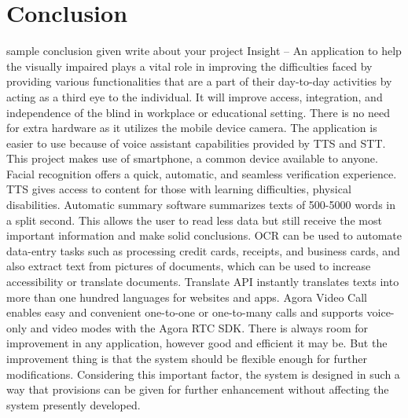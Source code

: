\chapter{Conclusion}
\thispagestyle{special}
sample conclusion given
write about your project
Insight – An application to help the visually impaired plays a vital role in improving the 
difficulties faced by providing various functionalities that are a part of their day-to-day
activities by acting as a third eye to the individual. It will improve access, integration, and 
independence of the blind in workplace or educational setting. There is no need for extra 
hardware as it utilizes the mobile device camera. The application is easier to use because 
of voice assistant capabilities provided by TTS and STT.
This project makes use of smartphone, a common device available to anyone. Facial 
recognition offers a quick, automatic, and seamless verification experience. TTS gives 
access to content for those with learning difficulties, physical disabilities. Automatic 
summary software summarizes texts of 500-5000 words in a split second. This allows the 
user to read less data but still receive the most important information and make solid 
conclusions.
OCR can be used to automate data-entry tasks such as processing credit cards, receipts, 
and business cards, and also extract text from pictures of documents, which can be used to 
increase accessibility or translate documents. Translate API instantly translates texts into 
more than one hundred languages for websites and apps. Agora Video Call enables easy 
and convenient one-to-one or one-to-many calls and supports voice-only and video modes 
with the Agora RTC SDK.
There is always room for improvement in any application, however good and efficient 
it may be. But the improvement thing is that the system should be flexible enough for 
further modifications. Considering this important factor, the system is designed in such a
way that provisions can be given for further enhancement without affecting the system 
presently developed. 
